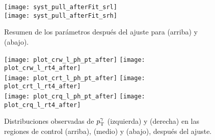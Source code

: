\begin{figure}[!htb]
  \centering

  \texttt{[image: syst\_pull\_afterFit\_srl]} \\
  \texttt{[image: syst\_pull\_afterFit\_srh]}

  \caption{Resumen de los parámetros después del ajuste para {\SRL} (arriba) y {\SRH} (abajo).}
  \label{fig:fit_unc_nuisance}

\end{figure}







\begin{figure}[!htb]
  \centering

  \texttt{[image: plot\_crw\_l\_ph\_pt\_after]}
  \texttt{[image: plot\_crw\_l\_rt4\_after]} \\

  \texttt{[image: plot\_crt\_l\_ph\_pt\_after]}
  \texttt{[image: plot\_crt\_l\_rt4\_after]} \\

  \texttt{[image: plot\_crq\_l\_ph\_pt\_after]}
  \texttt{[image: plot\_crq\_l\_rt4\_after]} \\

   \caption{Distribuciones observadas de $p_{\mathrm{T}}^\gamma$ (izquierda) y {\rt} (derecha) en las
     regiones de control {\CRWL} (arriba), {\CRTL} (medio) y {\CRQL} (abajo),
     después del ajuste.}
   \label{fig:bkgfit_crl_after}

\end{figure}


